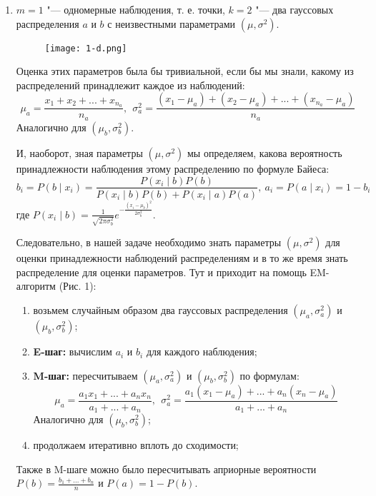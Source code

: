     \begin{enumerate}

    \item

    $m = 1$ "--- одномерные наблюдения, т. е. точки, $k = 2$ "--- два гауссовых распределения $a$ и $b$ с неизвестными параметрами $(\mu, \sigma^2)$.

    \begin{figure}[h]
    \begin{center}
    \texttt{[image: 1-d.png]}
    \caption{}
    \label{ris:experimcoded}
    \end{center}
    \end{figure}

    Оценка этих параметров была бы тривиальной, если бы мы знали, какому из распределений принадлежит каждое из наблюдений:
    $$\mu_a = \frac{x_1 + x_2 + ... + x_{n_a}}{n_a}, \ \ \sigma^2_a = \frac{(x_1 - \mu_a) + (x_2 - \mu_a) + ... + (x_{n_a} - \mu_a)}{n_a}$$
    Аналогично для $(\mu_b, \sigma^2_b)$.

    И, наоборот, зная параметры $(\mu, \sigma^2)$ мы определяем, какова вероятность принадлежности наблюдения этому распределению по формуле Байеса:
    $$ b_i = P(b \mid x_i) = \frac{P(x_i \mid b)P(b)}{P(x_i \mid b)P(b)+P(x_i \mid a)P(a)}, \ a_i = P(a \mid x_i) = 1 - b_i$$
    где $P(x_i \mid b) = \frac{1}{\sqrt{2\pi\sigma^2_b}}e^{-\frac{(x_i-\mu_b)^2}{2\sigma^2_b}}$.

    Следовательно, в нашей задаче необходимо знать параметры $(\mu, \sigma^2)$ для оценки принадлежности наблюдений распределениям и в то же время знать распределение для оценки параметров. Тут и приходит на помощь EM-алгоритм (Рис. 1):
        \begin{enumerate}
        \item
        возьмем случайным образом два гауссовых распределения $(\mu_a, \sigma^2_a)$ и $(\mu_b, \sigma^2_b)$;
        \item
        \textbf{E-шаг:} вычислим $a_i$ и $b_i$ для каждого наблюдения;
        \item
        \textbf{M-шаг:} пересчитываем $(\mu_a, \sigma^2_a)$ и $(\mu_b, \sigma^2_b)$ по формулам:
        $$\mu_a = \frac{a_1x_1 + ... + a_nx_n}{a_1 + ... + a_n}, \ \ \sigma^2_a = \frac{a_1(x_1 - \mu_a) + ... + a_n(x_n - \mu_a)}{a_1 + ... + a_n}$$
        Аналогично для $(\mu_b, \sigma^2_b)$;
        \item
        продолжаем итеративно вплоть до сходимости;
        \end{enumerate}
    Также в M-шаге можно было пересчитывать априорные вероятности $P(b) = \frac{b_1 + ... + b_n}{n}$ и $P(a) = 1 - P(b)$.


\end{enumerate}
